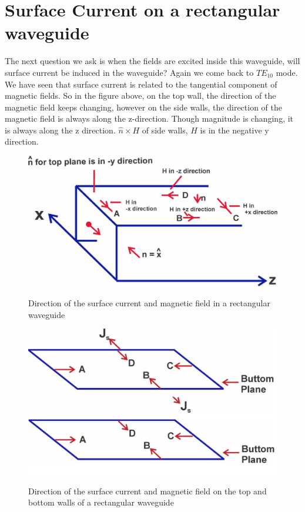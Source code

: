 \section{Surface Current on a rectangular waveguide}
The next question we ask is when the fields are excited inside this waveguide, will surface current be induced in the waveguide? Again we come back to $TE_{10}$ mode. We have seen that surface current is related to the tangential component of magnetic fields. So in the figure above, on the top wall, the direction of the magnetic field keeps changing, however on the side walls, the direction of the magnetic field is always along the z-direction. Though magnitude is changing, it is always along the z direction. $\hat{n} \times H$ of side walls, $H$ is in the negative y direction.
\begin{figure}[h]
\centering
\includegraphics[width=1\linewidth]{./graphics/lecture-image-5.jpg}
\label{fig:lectureimage5}
\caption{Direction of the surface current and magnetic field in a rectangular waveguide}
\end{figure}
\begin{figure}[h]
\centering
\includegraphics[width=1\linewidth]{./graphics/lecture-image-6.jpg}
\label{fig:lectureimage6}
\caption{Direction of the surface current and magnetic field on the top and bottom walls of a rectangular waveguide}
\end{figure}

